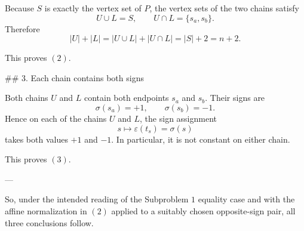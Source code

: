 Because \(S\) is exactly the vertex set of \(P\), the vertex sets of the two chains satisfy
\[
U\cup L=S,\qquad U\cap L=\{s_a,s_b\}.
\]
Therefore
\[
|U|+|L|
=|U\cup L|+|U\cap L|
=|S|+2
=n+2.
\]

This proves \( (2)\).

## 3. Each chain contains both signs

Both chains \(U\) and \(L\) contain both endpoints \(s_a\) and \(s_b\). Their signs are
\[
\sigma(s_a)=+1,\qquad \sigma(s_b)=-1.
\]
Hence on each of the chains \(U\) and \(L\), the sign assignment
\[
s\longmapsto \varepsilon(t_s)=\sigma(s)
\]
takes both values \(+1\) and \(-1\). In particular, it is not constant on either chain.

This proves \( (3)\).

---

So, under the intended reading of the Subproblem \(1\) equality case and with the affine normalization in \( (2)\) applied to a suitably chosen opposite-sign pair, all three conclusions follow.